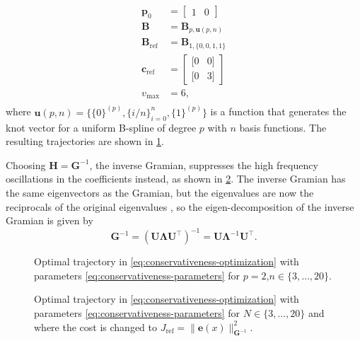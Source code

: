 \begin{equation}\label{eq:conservativeness-parameters}
    \begin{aligned}
        \mathbf p_0 &= \begin{bmatrix} 1 & 0 \end{bmatrix} \\
        \mathbf B &= \mathbf B_{p, \mathbf u(p,n)} \\
        \mathbf B_\text{ref} &= \mathbf B_{1,\{0, 0, 1, 1\}} \\
        \mathbf c_\text{ref} &= \begin{bmatrix}
            [0 & 0] \\
            [0 & 3]
        \end{bmatrix} \\
        v_\text{max} &= 6, \\
    \end{aligned}
\end{equation}
where $\mathbf u(p,n) = \{\{0\}^{(p)}, \{i/n\}_{i=0}^{n}, \{1\}^{(p)}\}$ is a function that generates the knot vector for a uniform B-spline of degree $p$ with $n$ basis functions. The resulting trajectories are shown in \cref{fig:conservativeness-traj-integral}.


Choosing $\mathbf H = \mathbf G^{-1}$, the inverse Gramian, suppresses the high frequency oscillations in the coefficients instead, as shown in \cref{fig:conservativeness-traj-inv-gramian}.  
The inverse Gramian has the same eigenvectors as the Gramian, but the eigenvalues are now the reciprocals of the original eigenvalues \citep{horn2013positive}, so the eigen-decomposition of the inverse Gramian is given by
\begin{equation}
    \mathbf G^{-1} = \left(\mathbf U \mathbf \Lambda \mathbf U^\top\right)^{-1} = \mathbf U \mathbf \Lambda^{-1} \mathbf U^\top.
\end{equation}


\begin{figure}[ht]
    \centering
    
    \caption{Optimal trajectory in \cref{eq:conservativeness-optimization} with parameters \cref{eq:conservativeness-parameters} for $p=2$,$n\in\{3,\ldots,20\}$.}
    \label{fig:conservativeness-traj-integral}
\end{figure}

\begin{figure}[ht]
    \centering
    
    \caption{Optimal trajectory in \cref{eq:conservativeness-optimization} with parameters \cref{eq:conservativeness-parameters} for $N\in\{3,\ldots,20\}$ and where the cost is changed to $J_\text{ref} = \|\mathbf e(x)\|_{\mathbf G^{-1}}^2$.}
    \label{fig:conservativeness-traj-inv-gramian}
\end{figure}


